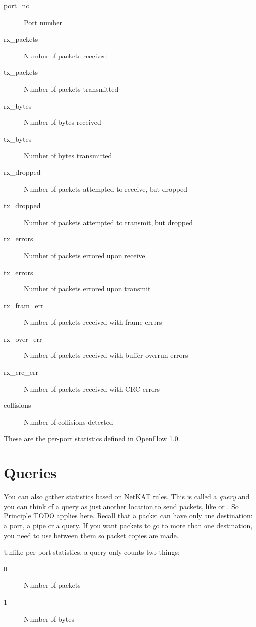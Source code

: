 \begin{description}
\item[port\_no] Port number  
\item[rx\_packets] Number of packets received  
\item[tx\_packets] Number of packets transmitted  
\item[rx\_bytes] Number of bytes received  
\item[tx\_bytes] Number of bytes transmitted  
\item[rx\_dropped] Number of packets attempted to receive, but dropped  
\item[tx\_dropped] Number of packets attempted to transmit, but dropped
\item[rx\_errors] Number of packets errored upon receive 
\item[tx\_errors] Number of packets errored upon transmit
\item[rx\_fram\_err] Number of packets received with frame errors
\item[rx\_over\_err] Number of packets received with buffer overrun errors
\item[rx\_crc\_err] Number of packets received with CRC errors
\item[collisions] Number of collisions detected
\end{description}

These are the per-port statistics defined in OpenFlow 1.0.  

\section{Queries}

You can also gather statistics based on NetKAT rules.  This is called a \emph{query} and you can think 
of a query as just another location to send packets, like  or .
So Principle TODO applies here.  Recall that a packet can have only one destination: a port, a pipe or a 
query.  If you want packets to go to more than one destination, you need to use  between
them so packet copies are made.

Unlike per-port statistics, a query only counts two things:

\begin{description}
\item[0] Number of packets  
\item[1] Number of bytes  
\end{description}

